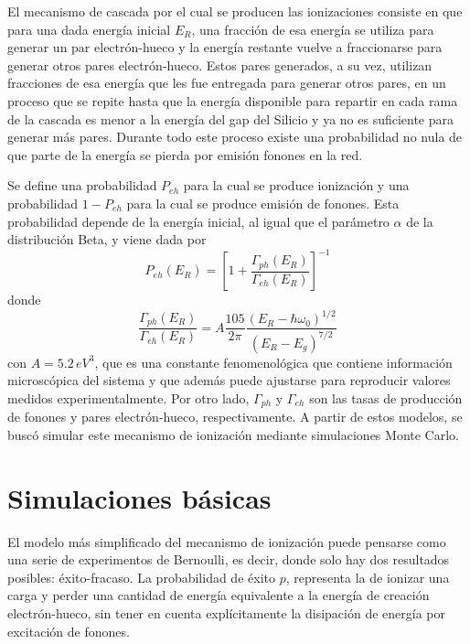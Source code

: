 El mecanismo de cascada por el cual se producen las ionizaciones consiste en que para una dada energía inicial $E_{R}$, una fracción de esa energía se utiliza para generar un par electrón-hueco y la energía restante vuelve a fraccionarse para generar otros pares electrón-hueco. Estos pares generados, a su vez, utilizan fracciones de esa energía que les fue entregada para generar otros pares, en un proceso que se repite hasta que la energía disponible para repartir en cada rama de la cascada es menor a la energía del gap del Silicio y ya no es suficiente para generar más pares. Durante todo este proceso existe una probabilidad no nula de que parte de la energía se pierda por emisión fonones en la red.

Se define una probabilidad $P_{eh}$ para la cual se produce ionización y una probabilidad $1 - P_{eh}$ para la cual se produce emisión de fonones. Esta probabilidad depende de la energía inicial, al igual que el parámetro $\alpha$ de la distribución Beta, y viene dada por
\begin{equation}
    P_{eh}(E_{R}) = 
    \left[
        1 + \frac{\Gamma_{ph}(E_{R})}{\Gamma_{eh}(E_{R})}
    \right]^{-1}
        \label{ec:ProbabilidadIonizacion}
\end{equation}
donde 
\begin{equation*}
    \frac{\Gamma_{ph}(E_{R})}{\Gamma_{eh}(E_{R})}
    = A\frac{105}{2\pi}\frac{(E_{R} - \hbar \omega_{0})^{1/2}}{(E_{R} - E_{g})^{7/2}}
\end{equation*}
con $A = 5.2\,\si{eV^{3}}$, que es una constante fenomenológica que contiene información microscópica del sistema y que además puede ajustarse para reproducir valores medidos experimentalmente. Por otro lado, $\Gamma_{ph}$ y $\Gamma_{eh}$ son las tasas de producción de fonones y pares electrón-hueco, respectivamente. A partir de estos modelos, se buscó simular este mecanismo de ionización mediante simulaciones Monte Carlo.
\section{Simulaciones básicas}
\noindent El modelo más simplificado del mecanismo de ionización puede pensarse como una serie de experimentos de Bernoulli, es decir, donde solo hay dos resultados posibles: éxito-fracaso. La probabilidad de éxito $p$, representa la de ionizar una carga y perder una cantidad de energía equivalente a la energía de creación electrón-hueco, sin tener en cuenta explícitamente la disipación de energía por excitación de fonones.

